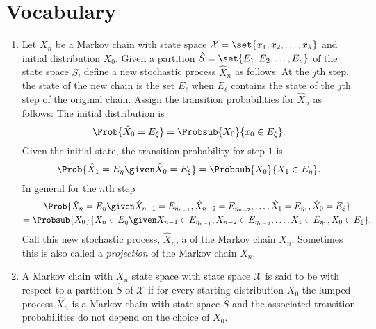 \documentclass[12pt]{article}
\begin{document}
\section*{Vocabulary}
\begin{enumerate}
    \item
        Let \( X_n \) be a Markov chain with state space \( \mathcal{X}
        = \set{x_1, x_2, \dots, x_k} \) and initial distribution \( X_0 \).
        Given a partition \( \hat{S} = \set{E_1, E_2, \dots, E_v} \) of
        the state space \( S \), define a new stochastic process \( \hat
        {X}_n \) as follows:  At the \( j \)th step, the state of the
        new chain is the set \( E_\ell \) when \( E_\ell \) contains the
        state of the \( j \)th step of the original chain.  Assign the
        transition probabilities for \( \hat{X}_n \) as follows:  The
        initial distribution is
        \[
            \Prob{\hat{X}_0 = E_{\xi}} = \Probsub{X_0}{x_0 \in E_{\xi}}.
        \] Given the initial state, the transition probability for step \(
        1 \) is
        \[
            \Prob{\hat{X}_1 = E_{\eta} \given \hat{X}_0 = E_{\xi}} =
            \Probsub{X_0} {X_1 \in E_{\eta} }.
        \] In general for the \( n \)th step
        \begin{multline*}
            \Prob{\hat{X}_n = E_{\eta} \given \hat{X}_{n-1} = E_{\eta_{n-1}},
            \hat{X}_{n-2} = E_{\eta_{n-2}}, \dots, \hat{X}_1 = E_{\eta_1},
            \hat{X}_0 = E_\xi} \\
            = \Probsub{X_0}{X_n \in E_{\eta} \given X_{n-1} \in E_{\eta_
            {n-1}}, X_{n-2} \in E_{\eta_{n-2}}, \dots, X_1 \in E_{\eta_1},
            X_0 \in E_{\xi}}.
        \end{multline*}
        Call this new stochastic process, \( \hat{X}_n \), a %
        of the Markov chain \( X_n \).  Sometimes this is also called a
        \emph{projection} of the Markov chain \( X_n \).
    \item
        A Markov chain with \( X_n \) state space with state space \(
        \mathcal{X} \) is said to be %
        with respect to a partition \( \hat{S} \) of \( \mathcal{X} \)
        if for every starting distribution \( X_0 \) the lumped process \(
        \hat{X}_n \) is a Markov chain with state space \( \hat{S} \)
        and the associated transition probabilities do not depend on the
        choice of \( X_0 \).

\end{enumerate}
\end{document}

